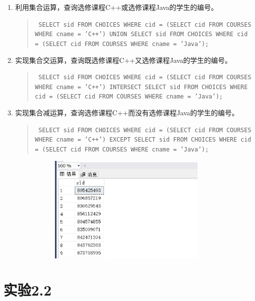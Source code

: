 \documentclass[a4paper,twoside]{article}
\begin{document}
\begin{spacing}{1.2}
\begin{enumerate}
\item 利用集合运算，查询选修课程C++或选修课程Java的学生的编号。
\begin{quote}
\texttt{
SELECT sid
FROM CHOICES
WHERE cid = (SELECT cid FROM COURSES WHERE cname = 'C++')
UNION
SELECT sid
FROM CHOICES
WHERE cid = (SELECT cid FROM COURSES WHERE cname = 'Java');
}
\end{quote}
\item 实现集合交运算，查询既选修课程C++又选修课程Java的学生的编号。
\begin{quote}
\texttt{
SELECT sid
FROM CHOICES
WHERE cid = (SELECT cid FROM COURSES WHERE cname = 'C++')
INTERSECT
SELECT sid
FROM CHOICES
WHERE cid = (SELECT cid FROM COURSES WHERE cname = 'Java');
}
\end{quote}
\item 实现集合减运算，查询选修课程C++而没有选修课程Java的学生的编号。
\begin{quote}
\texttt{
SELECT sid
FROM CHOICES
WHERE cid = (SELECT cid FROM COURSES WHERE cname = 'C++')
EXCEPT
SELECT sid
FROM CHOICES
WHERE cid = (SELECT cid FROM COURSES WHERE cname = 'Java');
}
\end{quote}

\begin{figure}[h]
\centering
\caption{运行结果}
\begin{subfigure}{0.3\textwidth}
  \includegraphics[width=0.9\textwidth]{fig27.png}
\end{subfigure}
\end{figure}

\end{enumerate}

\clearpage

\section{实验2.2}


\end{spacing}
\end{document}
